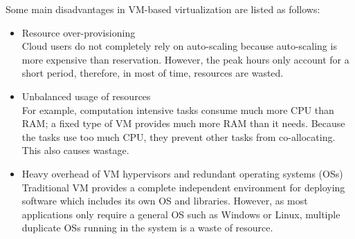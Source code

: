 Some main disadvantages in VM-based virtualization are listed as follows:
\begin{itemize}
	\item Resource over-provisioning \\
	 Cloud users do not completely rely on auto-scaling because auto-scaling is more expensive than reservation. However, the peak hours only account for a short period, therefore, in most of time, resources are wasted.

	\item Unbalanced usage of resources \\
	For example, computation intensive tasks consume much more CPU than RAM; a fixed type of VM provides much more RAM than it needs. Because the tasks use too much CPU, they prevent other tasks from co-allocating. This also causes wastage.

	\item Heavy overhead of VM hypervisors and redundant operating systems (OSs) \\
	 Traditional VM provides a complete independent environment for deploying software which includes its own OS and libraries. However, as most applications only require a general OS such as Windows or Linux, multiple duplicate OSs running in the system is a waste of resource.
\end{itemize}


